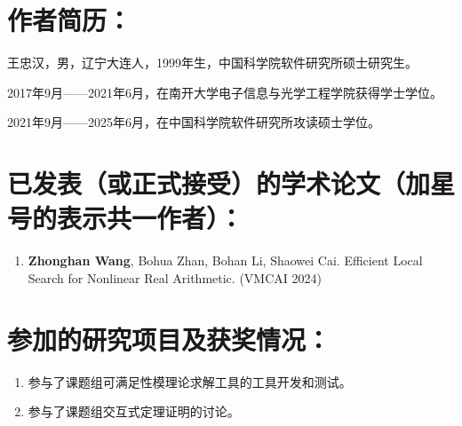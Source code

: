\section*{作者简历：}

王忠汉，男，辽宁大连人，1999年生，中国科学院软件研究所硕士研究生。

2017年9月——2021年6月，在南开大学电子信息与光学工程学院获得学士学位。

2021年9月——2025年6月，在中国科学院软件研究所攻读硕士学位。

\section*{已发表（或正式接受）的学术论文（加星号的表示共一作者）：}

{
\setlist[enumerate]{}%
\begin{enumerate}[nosep]
    \item \textbf{Zhonghan Wang}, Bohua Zhan, Bohan Li, Shaowei Cai. Efficient Local Search for Nonlinear Real Arithmetic. (VMCAI 2024)
\end{enumerate}
}



\section*{参加的研究项目及获奖情况：}

\begin{enumerate}
    \item 参与了课题组可满足性模理论求解工具的工具开发和测试。
    \item 参与了课题组交互式定理证明的讨论。
\end{enumerate}

\cleardoublepage[plain]%
